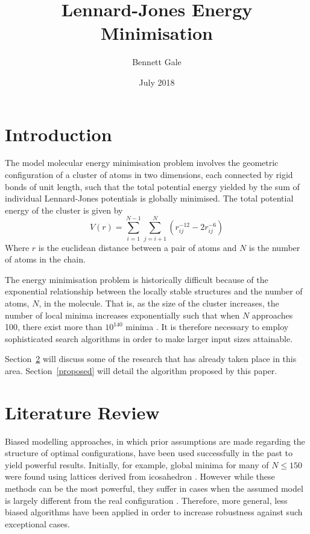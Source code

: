 \documentclass{article}
\title{Lennard-Jones Energy Minimisation}
\author{Bennett Gale}
\date{July 2018}
\begin{document}
\maketitle
\tableofcontents
\pagebreak

\section{Introduction}

The model molecular energy minimisation problem involves the geometric
configuration of a cluster of atoms in two dimensions, each connected by rigid
bonds of unit length, such that the total potential energy yielded by the sum of
individual Lennard-Jones potentials is globally minimised. The total potential
energy of the cluster is given by 
$$V(r)=\sum^{N-1}_{i=1}\sum^{N}_{j=i+1}\left(r^{-12}_{ij}-2r^{-6}_{ij}\right)$$
Where $r$ is the euclidean distance between a pair of atoms and $N$ is the
number of atoms in the chain.

The energy minimisation problem is historically difficult because of the
exponential relationship between the locally stable structures and the number of
atoms, $N$, in the molecule. That is, as the size of the cluster increases, the
number of local minima increases exponentially such that when $N$ approaches
100, there exist more than $10^{140}$ minima \cite{DAVEN1996195}. It is
therefore necessary to employ sophisticated search algorithms in order to make
larger input sizes attainable.

Section~\ref{litreview} will discuss some of the research that has already taken
place in this area. Section~\ref{proposed} will detail the algorithm proposed by
this paper.

\section{Literature Review} \label{litreview}

Biased modelling approaches, in which prior assumptions are made regarding the
structure of optimal configurations, have been used successfully in the past to
yield powerful results. Initially, for example, global minima for many of
$N\leq150$ were found using lattices derived from icosahedron
\cite{doi:10.1063/1.453492}. However while these methods can be the most
powerful, they suffer in cases when the assumed model is largely different from
the real configuration \cite{doi:10.1002/jcc.20096}. Therefore, more general,
less biased algorithms have been applied in order to increase robustness against
such exceptional cases.
\end{document}
